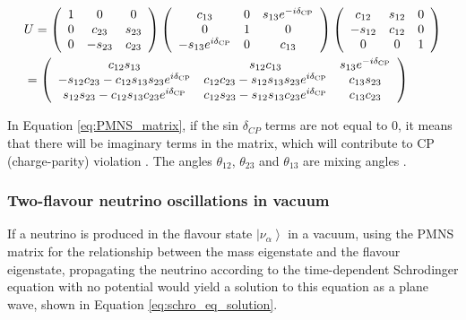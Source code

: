 \begin{align}
&U=\left(\begin{array}{ccc} \label{eq:PMNS_matrix}
1 & 0 & 0 \\
0 & c_{23} & s_{23} \\
0 & -s_{23} & c_{23}
\end{array}\right)\left(\begin{array}{ccc}
c_{13} & 0 & s_{13} e^{-i \delta_{\mathrm{CP}}} \\
0 & 1 & 0 \\
-s_{13} e^{i \delta_{\mathrm{CP}}} & 0 & c_{13}
\end{array}\right)\left(\begin{array}{ccc}
c_{12} & s_{12} & 0 \\
-s_{12} & c_{12} & 0 \\
0 & 0 & 1
\end{array}\right)\\
&=\left(\begin{array}{ccc} \notag
c_{12} s_{13} & s_{12} c_{13} & s_{13} e^{-i \delta_{\mathrm{CP}}} \\
-s_{12} c_{23}-c_{12} s_{13} s_{23} e^{i \delta_{\mathrm{CP}}} & c_{12} c_{23}-s_{12} s_{13} s_{23} e^{i \delta_{\mathrm{CP}}} & c_{13} s_{23} \\
s_{12} s_{23}-c_{12} s_{13} c_{23} e^{i \delta_{\mathrm{CP}}} & c_{12} s_{23}-s_{12} s_{13} c_{23} e^{i \delta_{\mathrm{CP}}} & c_{13} c_{23}
\end{array}\right)
\end{align}



In Equation \ref{eq:PMNS_matrix}, if the sin $\delta_{CP}$ terms are not equal to 0, it means that there will be imaginary terms in the matrix, which will contribute to CP (charge-parity) violation \cite{NUNOKAWA2008338}. The angles $\theta_{12}$, $\theta_{23}$ and $\theta_{13}$ are mixing angles \cite{giganti2018neutrino}.

\subsubsection{Two-flavour neutrino oscillations in vacuum}

If a neutrino is produced in the flavour state $\left|\nu_{\alpha}\right\rangle$ in a vacuum, using the PMNS matrix for the relationship between the mass eigenstate and the flavour eigenstate, propagating the neutrino according to the time-dependent Schrodinger equation with no potential would yield a solution to this equation as a plane wave, shown in Equation \ref{eq:schro_eq_solution}.

